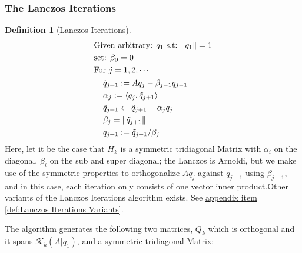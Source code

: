 \documentclass[]{article}
\theoremstyle{definition}
\newtheorem{definition}{Definition}      %
\begin{document}
        \subsubsection{The Lanczos Iterations}
            \begin{definition}[Lanczos Iterations]
                \begin{align}
                    & \text{Given arbitrary: } q_1 \text{ s.t: } \Vert q_1\Vert = 1
                    \\
                    & \text{set: }\beta_0 = 0
                    \\
                    & \text{For } j = 1, 2, \cdots 
                    \\
                    &\hspace{1.1em}\begin{aligned}
                        & \tilde{q}_{j + 1} := Aq_j - \beta_{j - 1}q_{j - 1}
                        \\
                        & \alpha_j := \langle q_j,\tilde{q}_{j + 1}\rangle
                        \\
                        & \tilde{q}_{j + 1} \leftarrow \tilde{q}_{j + 1} - \alpha_j q_j
                        \\
                        & \beta_j = \Vert \tilde{q}_{j + 1}\Vert
                        \\
                        & q_{j + 1} := \tilde{q}_{j + 1}/\beta_j
                    \end{aligned}
                \end{align}
                Here, let it be the case that $H_k$ is a symmetric tridiagonal Matrix with $\alpha_i$ on the diagonal, $\beta_i$ on the sub and super diagonal; the Lanczos is Arnoldi, but we make use of the symmetric properties to orthogonalize $Aq_j$ against $q_{j - 1}$ using $\beta_{j-1}$, and in this case, each iteration only consists of one vector inner product.Other variants of the Lanczos Iterations algorithm exists. See \hyperref[def:Lanczos Iterations Variants]{appendix item \ref*{def:Lanczos Iterations Variants}}. 
                
            \end{definition}
            The algorithm generates the following two matrices, $Q_k$ which is orthogonal and it spans $\mathcal K_k(A|q_1)$, and a symmetric tridiagonal Matrix: 
\end{document}
